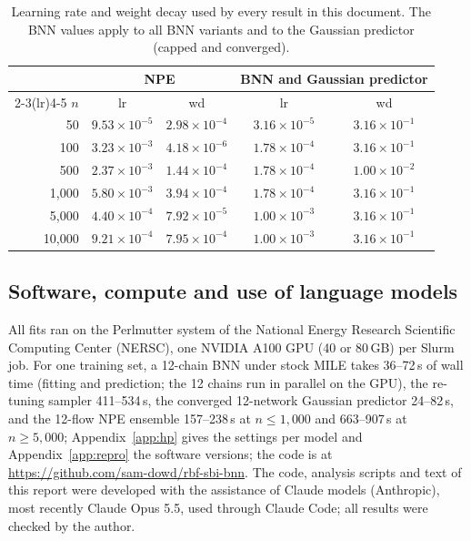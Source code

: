 \documentclass[11pt]{article}
\begin{document}
\begin{table}[h]
\centering\small
\begin{tabular}{rcccc}
\toprule
 & \multicolumn{2}{c}{NPE} & \multicolumn{2}{c}{BNN and Gaussian predictor} \\
\cmidrule(lr){2-3}\cmidrule(lr){4-5}
$n$ & lr & wd & lr & wd \\
\midrule
50      & $9.53\times10^{-5}$ & $2.98\times10^{-4}$ & $3.16\times10^{-5}$ & $3.16\times10^{-1}$ \\
100     & $3.23\times10^{-3}$ & $4.18\times10^{-6}$ & $1.78\times10^{-4}$ & $3.16\times10^{-1}$ \\
500     & $2.37\times10^{-3}$ & $1.44\times10^{-4}$ & $1.78\times10^{-4}$ & $1.00\times10^{-2}$ \\
1{,}000 & $5.80\times10^{-3}$ & $3.94\times10^{-4}$ & $1.78\times10^{-4}$ & $3.16\times10^{-1}$ \\
5{,}000 & $4.40\times10^{-4}$ & $7.92\times10^{-5}$ & $1.00\times10^{-3}$ & $3.16\times10^{-1}$ \\
10{,}000& $9.21\times10^{-4}$ & $7.95\times10^{-4}$ & $1.00\times10^{-3}$ & $3.16\times10^{-1}$ \\
\bottomrule
\end{tabular}
\caption{Learning rate and weight decay used by every result in this document. The BNN values apply to all BNN
variants and to the Gaussian predictor (capped and converged).}
\label{tab:hp}
\end{table}

\subsection{Software, compute and use of language models}
\label{sec:compute}
All fits ran on the Perlmutter system of the National Energy Research Scientific Computing Center (NERSC), one
NVIDIA A100 GPU (40 or 80\,GB) per Slurm job. For one training set, a 12-chain BNN under stock MILE takes 36--72\,s of
wall time (fitting and prediction; the 12 chains run in parallel on the GPU), the re-tuning sampler 411--534\,s, the
converged 12-network Gaussian predictor 24--82\,s, and the 12-flow NPE ensemble 157--238\,s at $n\le1{,}000$ and
663--907\,s at $n\ge5{,}000$; Appendix~\ref{app:hp} gives the settings per model and Appendix~\ref{app:repro} the
software versions; the code is at \url{https://github.com/sam-dowd/rbf-sbi-bnn}. The code, analysis scripts and text of this report were developed with the assistance of Claude
models (Anthropic), most recently Claude Opus 5.5, used through Claude Code; all results were checked by the author.
\end{document}
